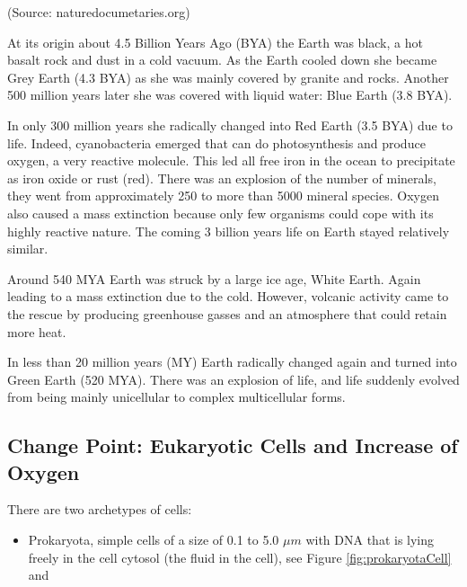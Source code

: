 \documentclass[
  11pt,
]{book}
\providecommand{\tightlist}{%
  \setlength{\itemsep}{0pt}\setlength{\parskip}{0pt}}
\begin{document}
(Source: naturedocumetaries.org)

At its origin about 4.5 Billion Years Ago (BYA) the Earth was black, a hot basalt rock and dust in a cold vacuum.
As the Earth cooled down she became Grey Earth (4.3 BYA) as she was mainly covered by granite and rocks. Another 500 million years later she was covered with liquid water: Blue Earth (3.8 BYA).

In only 300 million years she radically changed into Red Earth (3.5 BYA) due to life. Indeed, cyanobacteria emerged that can do photosynthesis and produce oxygen, a very reactive molecule. This led all free iron in the ocean to precipitate as iron oxide or rust (red). There was an explosion of the number of minerals, they went from approximately 250 to more than 5000 mineral species. Oxygen also caused a mass extinction because only few organisms could cope with its highly reactive nature. The coming 3 billion years life on Earth stayed relatively similar.

Around 540 MYA Earth was struck by a large ice age, White Earth.
Again leading to a mass extinction due to the cold. However, volcanic activity came to the rescue by producing greenhouse gasses and an atmosphere that could retain more heat.

In less than 20 million years (MY) Earth radically changed again and turned into Green Earth (520 MYA). There was an explosion of life, and life suddenly evolved from being mainly unicellular to complex multicellular forms.

\hypertarget{change-point-eukaryotic-cells-and-increase-of-oxygen}{%
\subsection{Change Point: Eukaryotic Cells and Increase of Oxygen}\label{change-point-eukaryotic-cells-and-increase-of-oxygen}}

There are two archetypes of cells:

\begin{itemize}
\tightlist
\item
  Prokaryota, simple cells of a size of 0.1 to 5.0 \(\mu m\) with DNA that is lying freely in the cell cytosol (the fluid in the cell), see Figure \ref{fig:prokaryotaCell} and
\end{itemize}
\end{document}
